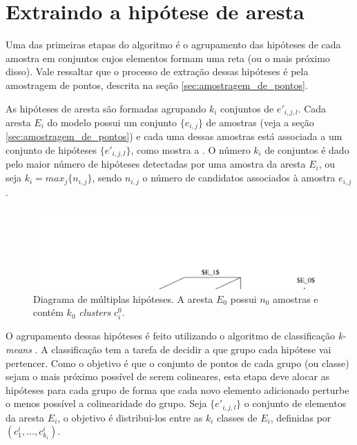 \section{Extraindo a hipótese de aresta}

Uma das primeiras etapas do algoritmo é o agrupamento das hipóteses de cada amostra em conjuntos cujos elementos formam uma reta (ou o mais próximo disso). Vale ressaltar que o processo de extração dessas hipóteses é pela amostragem de pontos, descrita na seção \ref{sec:amostragem_de_pontos}.

As hipóteses de aresta são formadas agrupando $k_i$ conjuntos de $e'_{i,j,l}$. Cada aresta $E_i$ do modelo possui um conjunto $\{e_{i,j}\}$ de amostras (veja a seção \ref{sec:amostragem_de_pontos}) e cada uma dessas amostras está associada a um conjunto de hipóteses $\{e'_{i,j,l}\}$, como mostra a . O número $k_i$ de conjuntos é dado pelo maior número de hipóteses detectadas por uma amostra da aresta $E_i$, ou seja $k_i = max_j\{n_{i,j}\}$, sendo $n_{i,j}$ o número de candidatos associados à amostra $e_{i,j}$.

\begin{figure}[!ht]
\centering\includegraphics[width=\textwidth]{monografia/multiple_hipotheses_diagram}
\caption{Diagrama de múltiplas hipóteses. A aresta $E_0$ possui $n_0$ amostras e contém $k_0$ \emph{clusters} $c^0_i$.}
\label{multiple_hipotheses_diagram}
\end{figure}

O agrupamento dessas hipóteses é feito utilizando o algoritmo de classificação \emph{k-means} \cite{kmeans}. A classificação tem a tarefa de decidir a que grupo cada hipótese vai pertencer. Como o objetivo é que o conjunto de pontos de cada grupo (ou classe) sejam o mais próximo possível de serem colineares, esta etapa deve alocar as hipóteses para cada grupo de forma que cada novo elemento adicionado perturbe o menos possível a colinearidade do grupo. Seja $\{e'_{i,j,l}\}$ o conjunto de elementos da aresta $E_i$, o objetivo é distribui-los entre as $k_i$ classes de $E_i$, definidas por $(c^i_1, \dots, c^i_{k_i})$.

